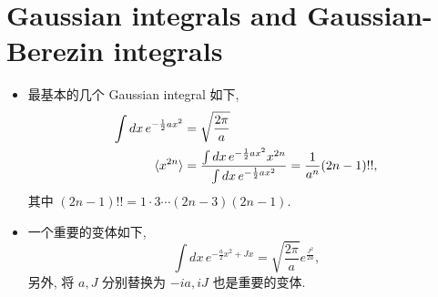 \chapter{Gaussian integrals and Gaussian-Berezin integrals}
\begin{itemize}
	\item 最基本的几个 Gaussian integral 如下,
	\begin{align}
		\int dx \, e^{- \frac{1}{2} a x^2} &= \sqrt{\frac{2 \pi}{a}} \\
		\braket{x^{2 n}} &= \frac{\int dx \, e^{- \frac{1}{2} a x^2} x^{2 n}}{\int dx \, e^{- \frac{1}{2} a x^2}} = \frac{1}{a^n} (2 n - 1)!!, \label{Gaussian integrals and Gaussian-Berezin integrals.0.2}
	\end{align}
	其中 $(2 n - 1)!! = 1 \cdot 3 \cdots (2 n - 3) (2 n - 1)$.
	
	\item 一个重要的变体如下,
	\begin{equation}
		\int dx \, e^{- \frac{a}{2} x^2 + J x} = \sqrt{\frac{2 \pi}{a}} e^{\frac{J^2}{2 a}},
	\end{equation}
	另外, 将 $a, J$ 分别替换为 $- i a, i J$ 也是重要的变体.
\end{itemize}

